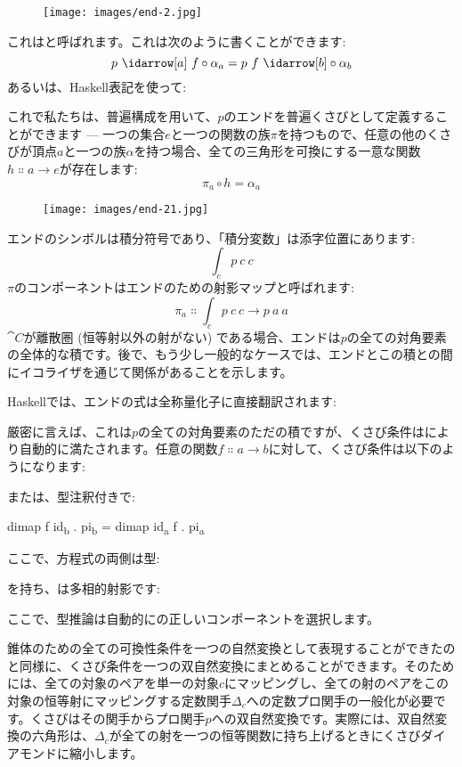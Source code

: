 \begin{figure}[H]
  \centering
  \texttt{[image: images/end-2.jpg]}
\end{figure}

\noindent
これはと呼ばれます。これは次のように書くことができます: 
\[p\ \idarrow[a]\ f \circ \alpha_a = p\ f\ \idarrow[b] \circ \alpha_b\]
あるいは、Haskell表記を使って: 

これで私たちは、普遍構成を用いて、$p$のエンドを普遍くさびとして定義することができます --- 一つの集合$e$と一つの関数の族$\pi$を持つもので、任意の他のくさびが頂点$a$と一つの族$\alpha$を持つ場合、全ての三角形を可換にする一意な関数$h \Colon a \to e$が存在します: 
\[\pi_a \circ h = \alpha_a\]

\begin{figure}[H]
  \centering
  \texttt{[image: images/end-21.jpg]}
\end{figure}

\noindent
エンドのシンボルは積分符号であり、「積分変数」は添字位置にあります: 
\[\int_c p\ c\ c\]
$\pi$のコンポーネントはエンドのための射影マップと呼ばれます: 
\[\pi_a \Colon \int_c p\ c\ c \to p\ a\ a\]
$\cat{C}$が離散圏 (恒等射以外の射がない) である場合、エンドは$p$の全ての対角要素の全体的な積です。後で、もう少し一般的なケースでは、エンドとこの積との間にイコライザを通じて関係があることを示します。

Haskellでは、エンドの式は全称量化子に直接翻訳されます: 

厳密に言えば、これは$p$の全ての対角要素のただの積ですが、くさび条件はにより自動的に満たされます。任意の関数$f \Colon a \to b$に対して、くさび条件は以下のようになります: 

または、型注釈付きで: 

\begin{snipv}
dimap f id\textsubscript{b} . pi\textsubscript{b} = dimap id\textsubscript{a} f . pi\textsubscript{a}
\end{snipv}
ここで、方程式の両側は型: 

を持ち、は多相的射影です: 

ここで、型推論は自動的にの正しいコンポーネントを選択します。

錐体のための全ての可換性条件を一つの自然変換として表現することができたのと同様に、くさび条件を一つの双自然変換にまとめることができます。そのためには、全ての対象のペアを単一の対象$c$にマッピングし、全ての射のペアをこの対象の恒等射にマッピングする定数関手$\Delta_c$への定数プロ関手の一般化が必要です。くさびはその関手からプロ関手$p$への双自然変換です。実際には、双自然変換の六角形は、$\Delta_c$が全ての射を一つの恒等関数に持ち上げるときにくさびダイアモンドに縮小します。

